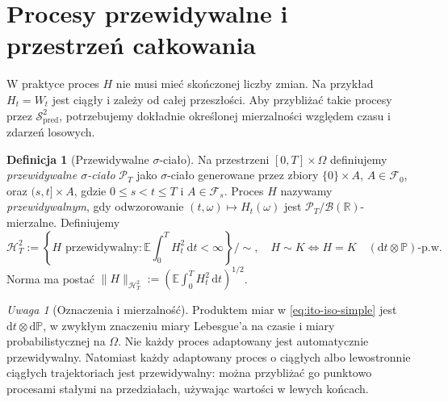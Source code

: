 \documentclass[11pt,a4paper,oneside]{report}
\numberwithin{equation}{chapter}
\theoremstyle{plain}
\theoremstyle{definition}
\newtheorem{definicja}{Definicja}[chapter]
\theoremstyle{remark}
\newtheorem{uwaga}{Uwaga}[chapter]
\newcommand{\R}{\mathbb{R}}
\newcommand{\Prob}{\mathbb{P}}
\newcommand{\E}{\mathbb{E}}
\newcommand{\calF}{\mathcal{F}}
\newcommand{\calH}{\mathcal{H}}
\newcommand{\calB}{\mathcal{B}}
\newcommand{\calP}{\mathcal{P}}
\newcommand{\calS}{\mathcal{S}}
\newcommand{\dd}{\mathrm{d}}
\newcommand{\norm}[1]{\lVert #1\rVert}
\begin{document}
\section{Procesy przewidywalne i przestrzeń całkowania}
W praktyce proces $H$ nie musi mieć skończonej liczby zmian.
Na przykład $H_t=W_t$ jest ciągły i zależy od całej
przeszłości. Aby przybliżać takie procesy przez
$\calS_{\mathrm{pred}}^2$, potrzebujemy dokładnie określonej
mierzalności względem czasu i zdarzeń losowych.

\begin{definicja}[Przewidywalne $\sigma$-ciało]
Na przestrzeni $[0,T]\times\Omega$ definiujemy
\emph{przewidywalne $\sigma$-ciało} $\calP_T$ jako
$\sigma$-ciało generowane przez zbiory
$\{0\}\times A$, $A\in\calF_0$, oraz
$(s,t]\times A$, gdzie $0\le s<t\le T$ i $A\in\calF_s$.
Proces $H$ nazywamy \emph{przewidywalnym}, gdy odwzorowanie
$(t,\omega)\mapsto H_t(\omega)$ jest
$\calP_T/\calB(\R)$-mierzalne.
Definiujemy
\[
\calH_T^2:=\left\{H\text{ przewidywalny}:
\E\int_0^T H_t^2\,\dd t<\infty\right\}\big/\sim,
\quad H\sim K\iff H=K\quad
(\dd t\otimes\Prob)\text{-p.w.}
\tag{2.5}
\]
Norma ma postać
$\norm{H}_{\calH_T^2}:=(\E\int_0^TH_t^2\,\dd t)^{1/2}$.
\end{definicja}

\begin{uwaga}[Oznaczenia i mierzalność]
Produktem miar w \eqref{eq:ito-iso-simple} jest
$\dd t\otimes\dd\Prob$, w zwykłym znaczeniu miary
Lebesgue'a na czasie i miary probabilistycznej na $\Omega$.
Nie każdy proces adaptowany jest automatycznie przewidywalny.
Natomiast każdy adaptowany proces o ciągłych albo
lewostronnie ciągłych trajektoriach jest przewidywalny:
można przybliżać go punktowo procesami stałymi na
przedziałach, używając wartości w lewych końcach.
\end{uwaga}
\end{document}
